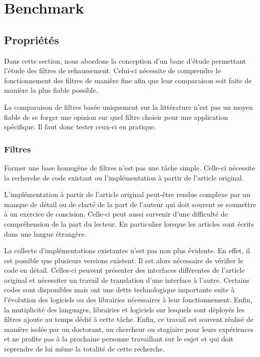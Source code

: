 %

\chapter{Benchmark}
\label{sec:Benchmark}


\section{Propriétés}
\label{sec:Benchmark}

Dans cette section, nous abordons la conception d'un banc d'étude permettant l'étude des filtres de rehaussement. Celui-ci nécessite de comprendre le fonctionnement des filtres de manière fine afin que leur comparaison soit faite de manière la plus fiable possible.

La comparaison de filtres basée uniquement sur la littérature n'est pas un moyen fiable de se forger une opinion sur quel filtre choisir pour une application spécifique. Il faut donc tester ceux-ci en pratique.

\subsection{Filtres}
\label{sec:Filtres}

Former une base homogène de filtres n'est pas une tâche simple. Celle-ci nécessite la recherche de code existant ou l'implémentation à partir de l'article original.

L'implémentation à partir de l'article original peut-être rendue complexe par un manque de détail ou de clarté de la part de l'auteur qui doit souvent se soumettre à un exercice de concision. Celle-ci peut aussi survenir d'une difficulté de compréhension de la part du lecteur. En particulier lorsque les articles sont écrits dans une langue étrangère. 

La collecte d'implémentations existantes n'est pas non plus évidente. En effet, il est possible que plusieurs versions existent. Il est alors nécessaire de vérifier le code en détail. Celles-ci peuvent présenter des interfaces différentes de l'article original et nécessiter un travail de translation d'une interface à l'autre. Certains codes sont disponibles mais ont une dette technologique importante suite à l'évolution des logiciels ou des librairies nécessaires à leur fonctionnement. Enfin, la mutiplicité des languages, librairies et logiciels sur lesquels sont déployés les filtres ajoute au temps dédié à cette tâche. Enfin, ce travail est souvent réalisé de manière isolée par un doctorant, un chercheur ou stagiaire pour leurs expériences et ne profite pas à la prochaine personne travaillant sur le sujet et qui doit reprendre de lui même la totalité de cette recherche.

